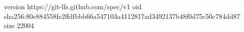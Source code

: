 version https://git-lfs.github.com/spec/v1
oid sha256:80e884558fe2ffdfbbb66a547103a4112817ad3492137b48f0d75c50c784dd87
size 22004
